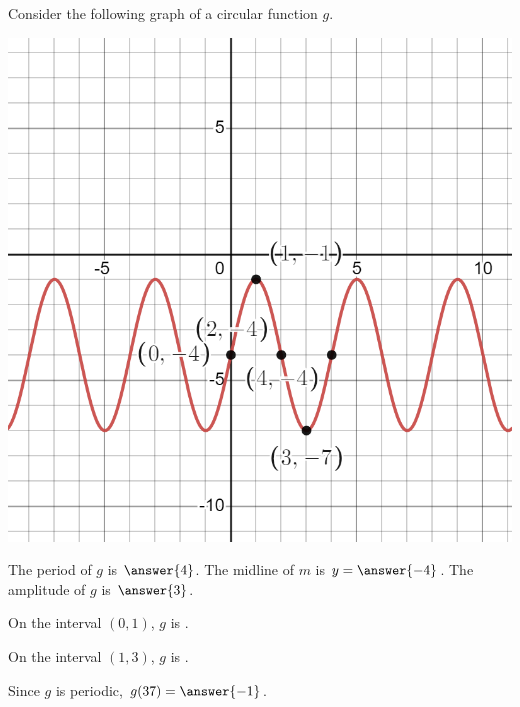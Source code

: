 \documentclass{ximera}
\author{Kenneth Berglund}
\begin{document}
\begin{exercise}
Consider the following graph of a circular function $g$.

\includegraphics[width=1\linewidth]{ex11.png}

The period of $g$ is $\answer{4}$. The midline of $m$ is $y = \answer{-4}$. The amplitude of $g$ is $\answer{3}$.

On the interval $(0, 1)$, $g$ is .

On the interval $(1, 3)$, $g$ is .

Since $g$ is periodic, $g(37) = \answer{-1}$. 


\end{exercise}
\end{document}
